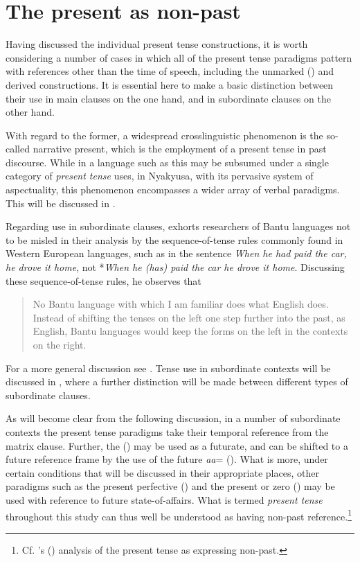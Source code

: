\label{MinorConstructions}
\section{The present as non-past}\label{PRSasNonPST}
Having discussed the individual present tense constructions, it is worth considering a number of cases in which all of the present tense paradigms pattern with references other than the time of speech, including the unmarked  () and derived constructions. It is essential here to make a basic distinction between their use in main clauses on the one hand, and in subordinate clauses on the other hand.

With regard to the former, a widespread crosslinguistic phenomenon is the so-called narrative present, which is the employment of a present tense in past  discourse. While in a language such as  this may be subsumed under a single category of \textit{present tense} uses, in Nyakyusa, with its pervasive system of aspectuality, this phenomenon encompasses a wider array of verbal paradigms. This will be discussed in .

Regarding use in subordinate clauses, \citet{NurseD2008} exhorts researchers of Bantu languages not to be misled in their analysis by the sequence-of-tense rules commonly found in Western European languages, such as in the  sentence \textit{When he had paid the car, he drove it home}, not *\textit{When he (has) paid the car he drove it home}. Discussing these sequence-of-tense rules, he observes that
\begin{quote}
No Bantu language with which I am familiar does what English does. Instead of shifting the tenses on the left one step further into the past, as English, Bantu languages would keep the forms on the left in the contexts on the right. \citep[159]{NurseD2008}
\end{quote}
For a more general discussion see \citet{CoverRTonhauserJ2015}. Tense use in subordinate contexts will be discussed in , where a further distinction will be made between different types of subordinate clauses.

As will become clear from the following discussion, in a number of subordinate contexts the present tense paradigms take their temporal reference from the matrix clause. Further, the  () may be used as a futurate, and can be shifted to a future reference frame by the use of the future  \textit{aa}= (). What is more, under certain conditions that will be discussed in their appropriate places, other paradigms such as the present perfective () and the present or zero  () may be used with reference to future state-of-affairs. What is termed \textit{present tense} throughout this study can thus well be understood as having non-past reference.\footnote{Cf. \citeauthor{KleinW1994}'s (\citeyear[124--128]{KleinW1994}) analysis of the  present tense as expressing non-past.}
